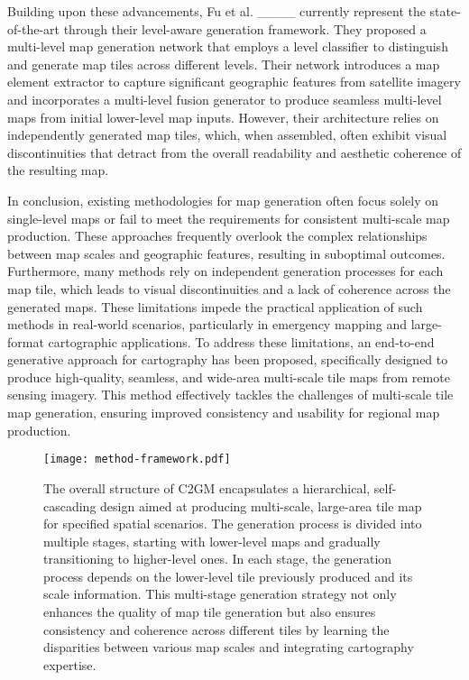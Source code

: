 Building upon these advancements, Fu et al. ____ currently represent the state-of-the-art through their level-aware generation framework. They proposed a multi-level map generation network that employs a level classifier to distinguish and generate map tiles across different levels. Their network introduces a map element extractor to capture significant geographic features from satellite imagery and incorporates a multi-level fusion generator to produce seamless multi-level maps from initial lower-level map inputs. However, their architecture relies on independently generated map tiles, which, when assembled, often exhibit visual discontinuities that detract from the overall readability and aesthetic coherence of the resulting map.

In conclusion, existing methodologies for map generation often focus solely on single-level maps or fail to meet the requirements for consistent multi-scale map production. These approaches frequently overlook the complex relationships between map scales and geographic features, resulting in suboptimal outcomes. Furthermore, many methods rely on independent generation processes for each map tile, which leads to visual discontinuities and a lack of coherence across the generated maps. These limitations impede the practical application of such methods in real-world scenarios, particularly in emergency mapping and large-format cartographic applications. To address these limitations, an end-to-end generative approach for cartography has been proposed, specifically designed to produce high-quality, seamless, and wide-area multi-scale tile maps from remote sensing imagery. This method effectively tackles the challenges of multi-scale tile map generation, ensuring improved consistency and usability for regional map production.

\begin{figure*}[htp]
	\centering
	\texttt{[image: method-framework.pdf]}
	\caption{
		The overall structure of C2GM encapsulates a hierarchical, self-cascading design aimed at producing multi-scale, large-area tile map for specified spatial scenarios. The generation process is divided into multiple stages, starting with lower-level maps and gradually transitioning to higher-level ones. In each stage, the generation process depends on the lower-level tile previously produced and its scale information. This multi-stage generation strategy not only enhances the quality of map tile generation but also ensures consistency and coherence across different tiles by learning the disparities between various map scales and integrating cartography expertise.
	}
	\label{fig:method-framework}
\end{figure*}